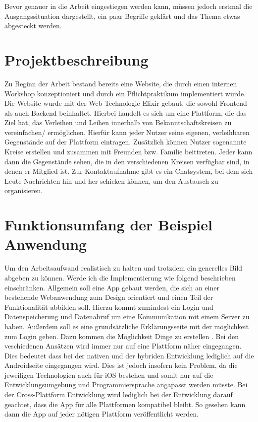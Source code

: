 Bevor genauer in die Arbeit eingestiegen werden kann, müssen jedoch erstmal die Ausgangssituation dargestellt, ein paar Begriffe geklärt und das Thema etwas abgesteckt werden.

\section{Projektbeschreibung}
Zu Beginn der Arbeit bestand bereits eine Website, die durch einen internen Workshop konzeptioniert und durch ein Pflichtpraktikum implementiert wurde. Die Website wurde mit der Web-Technologie Elixir gebaut, die sowohl Frontend als auch Backend beinhaltet. Hierbei handelt  es sich um eine Plattform, die das Ziel hat, das Verleihen und Leihen innerhalb von Bekanntschaftskreisen zu vereinfachen/ ermöglichen. Hierfür kann jeder Nutzer seine eigenen, verleihbaren Gegenstände auf der Plattform eintragen. Zusätzlich können Nutzer sogenannte Kreise erstellen und zusammen mit Freunden bzw. Familie beittreten. Jeder kann dann die Gegenstände sehen, die in den verschiedenen Kreisen verfügbar sind, in denen er Mitglied ist. Zur Kontaktaufnahme gibt es ein Chatsystem, bei dem sich Leute Nachrichten hin und her schicken können, um den Austausch zu organisieren.

\section{Funktionsumfang der Beispiel Anwendung}
Um den Arbeitsaufwand realistisch zu halten und trotzdem ein generelles Bild abgeben zu können. Werde ich die Implementierung wie folgend beschrieben einschränken.
Allgemein soll eine App gebaut werden, die sich an einer bestehende Webanwendung zum Design orientiert und einen Teil der Funktionalität abbilden soll.
Hierzu kommt zumindest ein Login und Datenspeicherung und Datenabruf um eine Kommunikation mit einem Server zu haben. Außerdem soll es eine grundsätzliche Erklärungsseite mit der möglichkeit zum Login geben. Dazu kommen die Möglichkeit Dinge zu erstellen
.
Bei den veschiedenen Ansätzen wird immer nur auf eine Plattform näher eingegangen. Dies bedeutet dass bei der nativen und der hybriden Entwicklung lediglich auf die Androidseite eingegangen wird. Dies ist jedoch insofern kein Problem, da die jeweiligen Technologien auch für iOS bestehen und somit nur auf die Entwicklungsumgebung und Programmiersprache angapasst werden müsste. Bei der Cross-Plattform Entwicklung wird lediglich bei der Entwicklung darauf geachtet, dass die App für alle Plattformen kompatibel bleibt. So gesehen kann dann die App auf jeder nötigen Plattform veröffentlicht werden.

